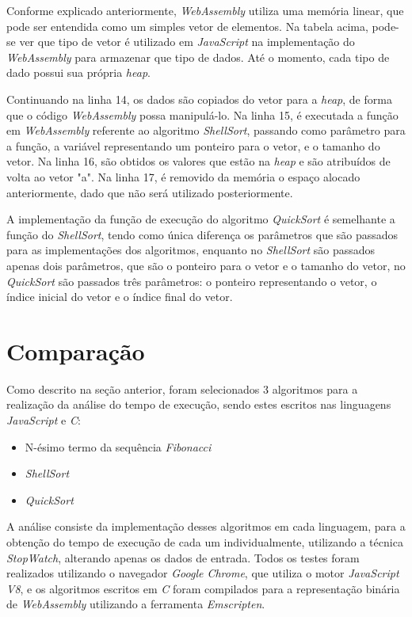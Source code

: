 Conforme explicado anteriormente, \textit{WebAssembly} utiliza uma memória linear, que
pode ser entendida como um simples vetor de elementos. Na tabela acima, pode-se ver que
tipo de vetor é utilizado em \textit{JavaScript} na implementação do \textit{WebAssembly}
para armazenar que tipo de dados. Até o momento, cada tipo de dado possui sua própria
\textit{heap}.

Continuando na linha 14, os dados são copiados do vetor para a \textit{heap}, de forma
que o código \textit{WebAssembly} possa manipulá-lo. Na linha 15, é executada a função em
\textit{WebAssembly} referente ao algoritmo \textit{ShellSort}, passando como parâmetro
para a função, a variável representando um ponteiro para o vetor, e o tamanho do vetor.
Na linha 16, são obtidos os valores que estão na \textit{heap} e são atribuídos de volta
ao vetor "a". Na linha 17, é removido da memória o espaço alocado anteriormente, dado
que não será utilizado posteriormente.



A implementação da função de execução do algoritmo \textit{QuickSort} é semelhante a
função do \textit{ShellSort}, tendo como única diferença os parâmetros que são passados
para as implementações dos algoritmos, enquanto no \textit{ShellSort} são passados apenas
dois parâmetros, que são o ponteiro para o vetor e o tamanho do vetor, no
\textit{QuickSort} são passados três parâmetros: o ponteiro representando o vetor, o
índice inicial do vetor e o índice final do vetor.

\section{Comparação}
\label{ssec:comparison}

Como descrito na seção anterior, foram selecionados 3 algoritmos para a realização da
análise do tempo de execução, sendo estes escritos nas linguagens \textit{JavaScript} e
\textit{C}:

\begin{itemize}
    \item N-ésimo termo da sequência \textit{Fibonacci}
    \item \textit{ShellSort}
    \item \textit{QuickSort}
\end{itemize}

A análise consiste da implementação desses algoritmos em cada linguagem, para a obtenção
do tempo de execução de cada um individualmente, utilizando a técnica \textit{StopWatch},
alterando apenas os dados de entrada. Todos os testes foram realizados utilizando o
navegador \textit{Google Chrome}, que utiliza o motor \textit{JavaScript V8}, e os
algoritmos escritos em \textit{C} foram compilados para a representação binária de
\textit{WebAssembly} utilizando a ferramenta \textit{Emscripten}.

